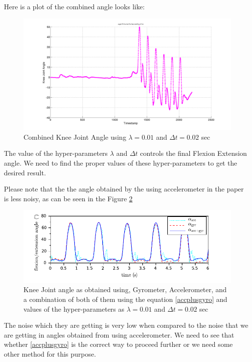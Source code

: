 \documentclass[12pt]{article}
\begin{document}
Here is a plot of the combined angle looks like:
\begin{figure}[!htb]
\includegraphics[scale=.3,center]{accplusgyro.png}
\caption{Combined Knee Joint Angle using $ \lambda = 0.01 $ and $ \Delta t = 0.02 $ sec}
\label{diffproject}
\end{figure}

The value of the hyper-parameters $ \lambda $ and $ \Delta t $ controls the final Flexion Extension angle. We need to find the proper values of these hyper-parameters to get the desired result.

Please note that the the angle obtained by the using accelerometer in the paper \cite{s140406891} is less noisy, as can be seen in the Figure \ref{lessDrifrinPaper}

\begin{figure}[!htb]
\includegraphics[scale=.6,center]{lessDriftinPaper.png}
\caption{Knee Joint angle as obtained using, Gyrometer, Accelerometer, and a combination of both of them using the equation \ref{accplusgyro} and values of the hyper-parameters as $ \lambda = 0.01 $ and $ \Delta t = 0.02 $ sec}
\label{lessDrifrinPaper}
\end{figure}
\FloatBarrier

The noise which they are getting is very low when compared to the noise that we are getting in angles obtained from using accelerometer. We need to see that whether \ref{accplusgyro} is the correct way to proceed further or we need some other method for this  purpose.

{}

\end{document}
